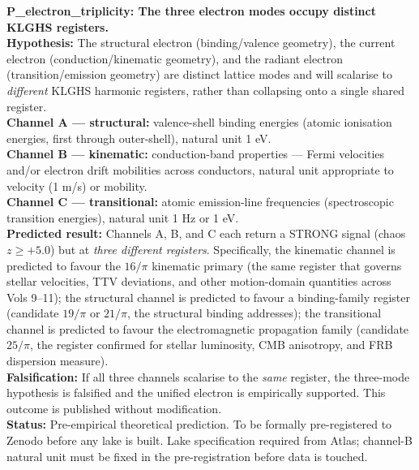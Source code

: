 \documentclass[11pt, letterpaper, openany]{book}
\begin{document}
\begin{predictionbox}
\textbf{P\_electron\_triplicity: The three electron modes occupy distinct
KLGHS registers.}\\[0.5em]
\textbf{Hypothesis:} The structural electron (binding/valence geometry),
the current electron (conduction/kinematic geometry), and the radiant
electron (transition/emission geometry) are distinct lattice modes and
will scalarise to \emph{different} KLGHS harmonic registers, rather than
collapsing onto a single shared register.\\[0.5em]
\textbf{Channel A --- structural:} valence-shell binding energies (atomic
ionisation energies, first through outer-shell), natural unit 1 eV.\\
\textbf{Channel B --- kinematic:} conduction-band properties --- Fermi
velocities and/or electron drift mobilities across conductors, natural
unit appropriate to velocity (1 m/s) or mobility.\\
\textbf{Channel C --- transitional:} atomic emission-line frequencies
(spectroscopic transition energies), natural unit 1 Hz or 1 eV.\\[0.5em]
\textbf{Predicted result:} Channels A, B, and C each return a STRONG
signal (chaos $z \geq +5.0$) but at \emph{three different registers}.
Specifically, the kinematic channel is predicted to favour the $16/\pi$
kinematic primary (the same register that governs stellar velocities,
TTV deviations, and other motion-domain quantities across Vols 9--11);
the structural channel is predicted to favour a binding-family register
(candidate $19/\pi$ or $21/\pi$, the structural binding addresses);
the transitional channel is predicted to favour the electromagnetic
propagation family (candidate $25/\pi$, the register confirmed for
stellar luminosity, CMB anisotropy, and FRB dispersion measure).\\[0.5em]
\textbf{Falsification:} If all three channels scalarise to the
\emph{same} register, the three-mode hypothesis is falsified and the
unified electron is empirically supported. This outcome is published
without modification.\\[0.5em]
\textbf{Status:} Pre-empirical theoretical prediction. To be formally
pre-registered to Zenodo before any lake is built. Lake specification
required from Atlas; channel-B natural unit must be fixed in the
pre-registration before data is touched.
\end{predictionbox}
 
\end{document}
